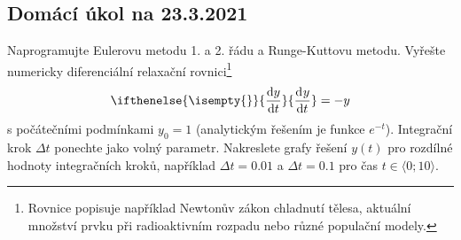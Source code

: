 \documentclass[a4paper,11pt,twoside]{article}
\renewcommand{\d}{\mathrm{d}}
\newcommand{\derivative}[3][]{\ifthenelse{\isempty{#1}}	    %
	{\frac{\d{#2}}{\d{#3}}}
	{\frac{\d^{#1}{#2}}{\d{#3}^{#1}}}
}
\theoremstyle{red}
\theoremstyle{green}
\begin{document}
\newpage
\subsection{Domácí úkol na 23.3.2021}
\begin{task}
\label{task:ODR1}
    Naprogramujte Eulerovu metodu 1. a 2. řádu a Runge-Kuttovu metodu.
    Vyřešte numericky diferenciální relaxační rovnici\footnote{
        Rovnice popisuje například Newtonův zákon chladnutí tělesa, aktuální množství prvku při radioaktivním rozpadu nebo různé populační modely.
    }
    \begin{equation}\label{eq:relaxace}
        \derivative{y}{t}=-y
    \end{equation}
    s počátečními podmínkami $y_{0}=1$ (analytickým řešením je funkce $e^{-t}$).
    Integrační krok $\Delta t$ ponechte jako volný parametr.
    Nakreslete grafy řešení $y(t)$ pro rozdílné hodnoty integračních kroků, například $\Delta t=0.01$ a $\Delta t=0.1$ pro čas $t\in\langle0;10\rangle$.
\end{task}
\end{document}
